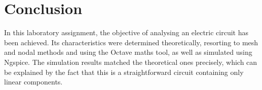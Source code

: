 \section{Conclusion}
\label{sec:conclusion}

In this laboratory assignment, the objective of analysing an electric circuit has been achieved. Its characteristics were determined theoretically, resorting to mesh and nodal methods and using the Octave maths tool, as well as simulated using Ngspice.
The simulation results matched the theoretical ones precisely, which can be explained by the fact that this is a straightforward circuit containing only linear components. 

